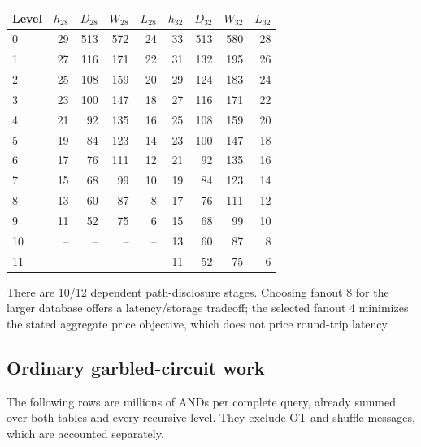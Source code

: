 \begin{center}\small
\begin{tabular}{lrrrrrrrr}\toprule
Level & $h_{28}$ & $D_{28}$ & $W_{28}$ & $L_{28}$ & $h_{32}$ & $D_{32}$ & $W_{32}$ & $L_{32}$\\\midrule
0 & 29 & 513 & 572 & 24 & 33 & 513 & 580 & 28\\
1 & 27 & 116 & 171 & 22 & 31 & 132 & 195 & 26\\
2 & 25 & 108 & 159 & 20 & 29 & 124 & 183 & 24\\
3 & 23 & 100 & 147 & 18 & 27 & 116 & 171 & 22\\
4 & 21 & 92 & 135 & 16 & 25 & 108 & 159 & 20\\
5 & 19 & 84 & 123 & 14 & 23 & 100 & 147 & 18\\
6 & 17 & 76 & 111 & 12 & 21 & 92 & 135 & 16\\
7 & 15 & 68 & 99 & 10 & 19 & 84 & 123 & 14\\
8 & 13 & 60 & 87 & 8 & 17 & 76 & 111 & 12\\
9 & 11 & 52 & 75 & 6 & 15 & 68 & 99 & 10\\
10 & -- & -- & -- & -- & 13 & 60 & 87 & 8\\
11 & -- & -- & -- & -- & 11 & 52 & 75 & 6\\
\bottomrule\end{tabular}
\end{center}

There are 10/12 dependent path-disclosure stages.
Choosing fanout 8 for the larger database offers a latency/storage tradeoff;
the selected fanout 4 minimizes the stated aggregate price objective, which
does not price round-trip latency.

\subsection{Ordinary garbled-circuit work}
The following rows are millions of ANDs per complete query, already summed
over both tables and every recursive level. They exclude OT and shuffle
messages, which are accounted separately.

